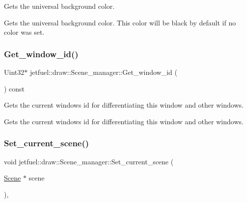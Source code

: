 Gets the universal background color. 

Gets the universal background color. This color will be black by default if no color was set. \mbox{\label{classjetfuel_1_1draw_1_1Scene__manager_a1758a86d40dcfaface8958fcd33676bf}} 
\subsubsection{\texorpdfstring{Get\+\_\+window\+\_\+id()}{Get\_window\_id()}}
{\footnotesize\ttfamily Uint32$\ast$ jetfuel\+::draw\+::\+Scene\+\_\+manager\+::\+Get\+\_\+window\+\_\+id (\begin{DoxyParamCaption}{ }\end{DoxyParamCaption}) const\hspace{0.3cm}{\ttfamily [inline]}}



Gets the current window\textquotesingle{}s id for differentiating this window and other windows. 

Gets the current window\textquotesingle{}s id for differentiating this window and other windows. \mbox{\label{classjetfuel_1_1draw_1_1Scene__manager_a3c2b083844adc254edfba9278222dac8}} 
\subsubsection{\texorpdfstring{Set\+\_\+current\+\_\+scene()}{Set\_current\_scene()}}
{\footnotesize\ttfamily void jetfuel\+::draw\+::\+Scene\+\_\+manager\+::\+Set\+\_\+current\+\_\+scene (\begin{DoxyParamCaption}\item[{\hyperlink{classjetfuel_1_1draw_1_1Scene}{Scene} $\ast$}]{scene }\end{DoxyParamCaption})\hspace{0.3cm}{\ttfamily [inline]}, {\ttfamily [protected]}}



